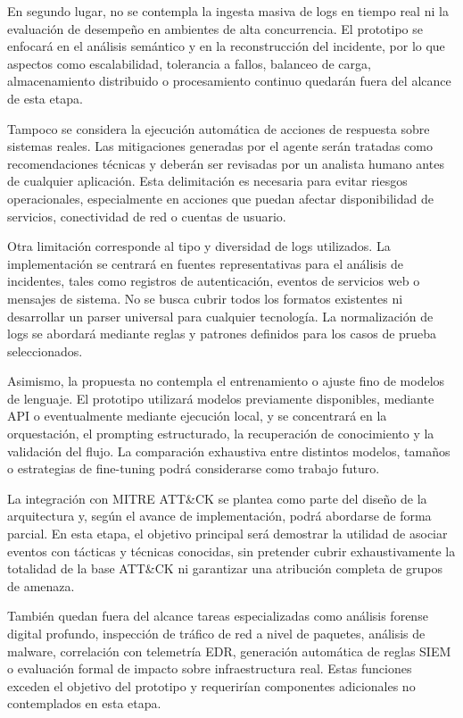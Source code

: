 En segundo lugar, no se contempla la ingesta masiva de logs en tiempo real ni la evaluación de desempeño en ambientes de alta concurrencia. El prototipo se enfocará en el análisis semántico y en la reconstrucción del incidente, por lo que aspectos como escalabilidad, tolerancia a fallos, balanceo de carga, almacenamiento distribuido o procesamiento continuo quedarán fuera del alcance de esta etapa.

Tampoco se considera la ejecución automática de acciones de respuesta sobre sistemas reales. Las mitigaciones generadas por el agente serán tratadas como recomendaciones técnicas y deberán ser revisadas por un analista humano antes de cualquier aplicación. Esta delimitación es necesaria para evitar riesgos operacionales, especialmente en acciones que puedan afectar disponibilidad de servicios, conectividad de red o cuentas de usuario.

Otra limitación corresponde al tipo y diversidad de logs utilizados. La implementación se centrará en fuentes representativas para el análisis de incidentes, tales como registros de autenticación, eventos de servicios web o mensajes de sistema. No se busca cubrir todos los formatos existentes ni desarrollar un parser universal para cualquier tecnología. La normalización de logs se abordará mediante reglas y patrones definidos para los casos de prueba seleccionados.

Asimismo, la propuesta no contempla el entrenamiento o ajuste fino de modelos de lenguaje. El prototipo utilizará modelos previamente disponibles, mediante API o eventualmente mediante ejecución local, y se concentrará en la orquestación, el prompting estructurado, la recuperación de conocimiento y la validación del flujo. La comparación exhaustiva entre distintos modelos, tamaños o estrategias de fine-tuning podrá considerarse como trabajo futuro.

La integración con MITRE ATT\&CK se plantea como parte del diseño de la arquitectura y, según el avance de implementación, podrá abordarse de forma parcial. En esta etapa, el objetivo principal será demostrar la utilidad de asociar eventos con tácticas y técnicas conocidas, sin pretender cubrir exhaustivamente la totalidad de la base ATT\&CK ni garantizar una atribución completa de grupos de amenaza.

También quedan fuera del alcance tareas especializadas como análisis forense digital profundo, inspección de tráfico de red a nivel de paquetes, análisis de malware, correlación con telemetría EDR, generación automática de reglas SIEM o evaluación formal de impacto sobre infraestructura real. Estas funciones exceden el objetivo del prototipo y requerirían componentes adicionales no contemplados en esta etapa.


